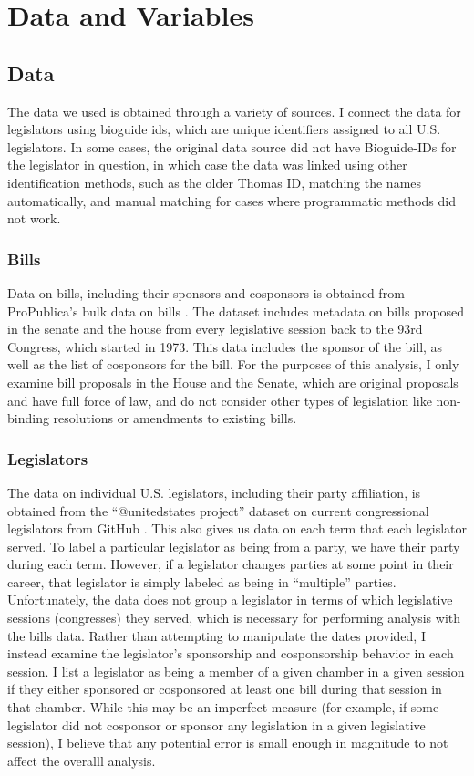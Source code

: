 \documentclass{article}
\begin{document}
\section{Data and Variables}
\subsection{Data} 
The data we used is obtained through a variety of sources. I connect the data for legislators using bioguide ids, which are unique identifiers assigned to all U.S. legislators. In some cases, the original data source did not have Bioguide-IDs for the legislator in question, in which case the data was linked using other identification methods, such as the older Thomas ID, matching the names automatically, and manual matching for cases where programmatic methods did not work. 

\subsubsection{Bills}
Data on bills, including their sponsors and cosponsors is obtained from ProPublica's bulk data on bills \cite{propublica}. The dataset includes metadata on bills proposed in the senate and the house from every legislative session back to the 93rd Congress, which started in 1973. This data includes the sponsor of the bill, as well as the list of cosponsors for the bill. For the purposes of this analysis, I only examine bill proposals in the House and the Senate, which are original proposals and have full force of law, and do not consider other types of legislation like non-binding resolutions or amendments to existing bills. 

\subsubsection{Legislators}
The data on individual U.S. legislators, including their party affiliation, is obtained from the ``@unitedstates project'' dataset on current congressional legislators from GitHub \cite{congress-legislators}. This also gives us data on each term that each legislator served. To label a particular legislator as being from a party, we have their party during each term. However, if a legislator changes parties at some point in their career, that legislator is simply labeled as being in ``multiple'' parties. Unfortunately, the data does not group a legislator in terms of which legislative sessions (congresses) they served, which is necessary for performing analysis with the bills data. Rather than attempting to manipulate the dates provided, I instead examine the legislator's sponsorship and cosponsorship behavior in each session. I list a legislator as being a member of a given chamber in a given session if they either sponsored or cosponsored at least one bill during that session in that chamber. While this may be an imperfect measure (for example, if some legislator did not cosponsor or sponsor any legislation in a given legislative session), I believe that any potential error is small enough in magnitude to not affect the overalll analysis.
\end{document}

